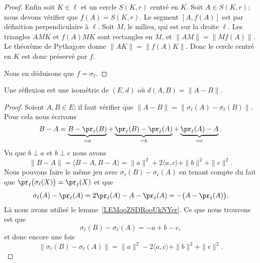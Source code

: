 \begin{proof}
    Enfin soit \( K\in\ell\) et un cercle \( S(K,r)\) centré en \( K\). Soit \( A\in S(K,r)\); nous devons vérifier que \( f(A)=S(K,r)\). Le segment \( [A,f(A)]\) est par définition perpendiculaire à \( \ell\). Soit \( M\), le milieu, qui est sur la droite \( \ell\). Les triangles \( AMK\) et \( f(A)MK\) sont rectangles en \( M\), et \( \| AM \|=\| Mf(A) \|\). Le théorème de Pythagore donne \( \| AK \|=\| f(A)K \|\). Donc le cercle centré en \( K\) est donc préservé par \( f\).

    Nous en déduisons que \( f=\sigma_{\ell}\).
\end{proof}

\begin{proposition}      \label{PROPooFSVEooWmJsnv}
    Une réflexion est une isométrie de \( (E,d)\) où \( d(A,B)=\| A-B \|\).
\end{proposition}

\begin{proof}
    Soient \( A,B\in E\); il faut vérifier que \( \| A-B \|=\| \sigma_{\ell}(A)-\sigma_{\ell}(B) \|\). Pour cela nous écrivons
    \begin{equation}
        B-A=\underbrace{B-\pr_{\ell}(B)}_{=a}+\underbrace{\pr_{\ell}(B)-\pr_{\ell}(A)}_{=b}+\underbrace{\pr_{\ell}(A)-A}_{=c}.
    \end{equation}
    Vu que \( b\perp a\) et \( b\perp c\) nous avons
    \begin{equation}
        \| B-A \|=\langle B-A, B-A\rangle =\| a \|^2+2\langle a, c\rangle +\| b \|^2+\| c \|^2.
    \end{equation}
    Nous pouvons faire le même jeu avec \( \sigma_{\ell}(B)-\sigma_{\ell}(A)\) en tenant compte du fait que \( \pr_{\ell}\big( \sigma_{\ell}(X) \big)=\pr_{\ell}(X)\) et que
    \begin{equation}
        \sigma_{\ell}(A)-\pr_{\ell}(A)=2\pr_{\ell}(A)-A-\pr_{\ell}(A)=-\big( A-\pr_{\ell}(A) \big).
    \end{equation}
    Là nous avons utilisé le lemme~\ref{LEMooZSDRooUkNYer}. Ce que nous trouvons est que
    \begin{equation}
        \sigma_{\ell}(B)-\sigma_{\ell}(A)=-a+b-c,
    \end{equation}
    et donc encore une fois
    \begin{equation}
        \| \sigma_{\ell}(B)-\sigma_{\ell}(A) \|=\| a \|^2-2\langle a, c\rangle +\| b \|^2+\| c \|^2.
    \end{equation}
\end{proof}

